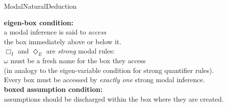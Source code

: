 
\calculusAcronym{\NDK}




\maketitle

\begin{entry}{ModalNaturalDeduction}  

\newcommand{\s}{\qquad}
\newcommand{\nec}{\Box} %
\newcommand{\pos}{\Diamond} %

\begin{calculus}

\s\s\s\s\s\s
\infer[\nec_I]{\nec A}{\omega: \fbox{\infer*{A}{}} }
\s\s\s\s
\infer[\nec_E]{w: \fbox{ \infer*{}{A} } }{\nec A}

\vspace{2em}

\s\s\s\s\s\s
\infer[\pos_I]{\pos A}{w: \fbox{\infer*{A}{}} }
\s\s\s\s
\infer[\pos_E]{\omega: \fbox{ \infer*{}{A} } }{\pos A}

\vspace{1em}


\begin{center}
\textbf{eigen-box condition:}\\ 
a modal inference is said to \emph{access}\\
 the box immediately above or below it. \\
$\nec_I$ and $\pos_E$ are \emph{strong} modal rules: \\
$\omega$ must be a fresh name for the box they access \\ 
(in analogy to the eigen-variable condition for strong quantifier rules). \\
Every box must be accessed by \emph{exactly one} strong modal inference. \\
\vspace{0.5em}
\textbf{boxed assumption condition:} \\
assumptions should be discharged within the box where they are created.
\end{center}

\end{calculus}



\end{entry}
